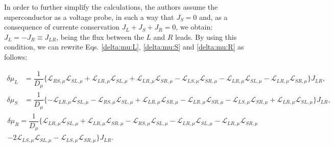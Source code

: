In order to further simplify the calculations, the authors assume the superconductor as a voltage probe, in such a way that $J_{S}=0$ and, as a consequence of currente conservation $J_{L}+J_{S}+J_{R}=0$, we obtain: $J_{L}=-J_{R}\equiv J_{LR}$, being the flux between the $L$ and $R$ leads. By using this condition, we can rewrite Eqs. \eqref{delta:mu:L}, \eqref{delta:mu:S} and \eqref{delta:mu:R} as follows:
\begin{widetext}
\begin{align}\label{delta:mu:L1}
\delta\mu_{L}&=\dfrac{1}{D_{\mu}}\{
\mathcal{L}_{RS,\mu} \mathcal{L}_{SL,\mu}+\mathcal{L}_{LR,\mu}\mathcal{L}_{SL,\mu}+\mathcal{L}_{LR,\mu}\mathcal{L}_{SR,\mu}
-
\mathcal{L}_{LS,\mu}\mathcal{L}_{SR,\mu}-\mathcal{L}_{LR,\mu}\mathcal{L}_{SL,\mu}-\mathcal{L}_{LR,\mu}\mathcal{L}_{SR,\mu}\}J_{LR},
\\\label{delta:mu:S1}
\delta\mu_{S}&=\dfrac{1}{D_{\mu}}\{
-\mathcal{L}_{LR,\mu}\mathcal{L}_{SL,\mu}-\mathcal{L}_{RS,\mu}\mathcal{L}_{SL,\mu} +\mathcal{L}_{LR,\mu} \mathcal{L}_{SR,\mu}
-
\mathcal{L}_{LR,\mu}\mathcal{L}_{SR,\mu}-\mathcal{L}_{LS,\mu}\mathcal{L}_{SR,\mu}+\mathcal{L}_{LR,\mu} \mathcal{L}_{SL,\mu}\}J_{LR},
\end{align}
\begin{multline}
\label{delta:mu:R1}
\delta\mu_{R}=\dfrac{1}{D_{\mu}}\{
\mathcal{L}_{LR,\mu}\mathcal{L}_{SL,\mu}+\mathcal{L}_{LR,\mu}\mathcal{L}_{SR,\mu}-\mathcal{L}_{RS,\mu} \mathcal{L}_{SL,\mu}
-
\mathcal{L}_{LR,\mu}\mathcal{L}_{SL,\mu}
-\mathcal{L}_{LR,\mu}\mathcal{L}_{SR,\mu}
\\- 2\mathcal{L}_{LS,\mu}\mathcal{L}_{SL,\mu}
-\mathcal{L}_{LS,\mu}\mathcal{L}_{SR,\mu}\}J_{LR}.
\end{multline}  
\end{widetext}


